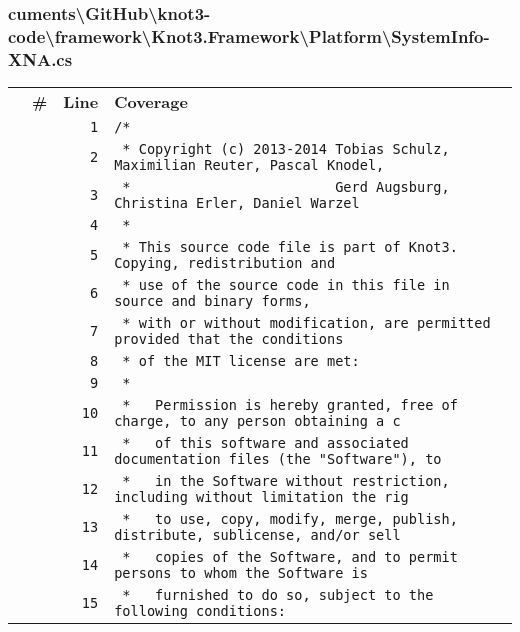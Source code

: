 \documentclass[a4paper,10pt]{article}
\begin{document}
\subsubsection{cuments\textbackslash GitHub\textbackslash knot3-code\textbackslash framework\textbackslash Knot3.Framework\textbackslash Platform\textbackslash SystemInfo-XNA.cs}
\begin{longtable}[l]{lrrl}
\textbf{} & \textbf{\#} & \textbf{Line} & \textbf{Coverage}\\
\cellcolor{gray} &  & \verb~1~ & \verb~/*~\\
\cellcolor{gray} &  & \verb~2~ & \verb~ * Copyright (c) 2013-2014 Tobias Schulz, Maximilian Reuter, Pascal Knodel,~\\
\cellcolor{gray} &  & \verb~3~ & \verb~ *                         Gerd Augsburg, Christina Erler, Daniel Warzel~\\
\cellcolor{gray} &  & \verb~4~ & \verb~ *~\\
\cellcolor{gray} &  & \verb~5~ & \verb~ * This source code file is part of Knot3. Copying, redistribution and~\\
\cellcolor{gray} &  & \verb~6~ & \verb~ * use of the source code in this file in source and binary forms,~\\
\cellcolor{gray} &  & \verb~7~ & \verb~ * with or without modification, are permitted provided that the conditions~\\
\cellcolor{gray} &  & \verb~8~ & \verb~ * of the MIT license are met:~\\
\cellcolor{gray} &  & \verb~9~ & \verb~ *~\\
\cellcolor{gray} &  & \verb~10~ & \verb~ *   Permission is hereby granted, free of charge, to any person obtaining a c~\\
\cellcolor{gray} &  & \verb~11~ & \verb~ *   of this software and associated documentation files (the "Software"), to ~\\
\cellcolor{gray} &  & \verb~12~ & \verb~ *   in the Software without restriction, including without limitation the rig~\\
\cellcolor{gray} &  & \verb~13~ & \verb~ *   to use, copy, modify, merge, publish, distribute, sublicense, and/or sell~\\
\cellcolor{gray} &  & \verb~14~ & \verb~ *   copies of the Software, and to permit persons to whom the Software is~\\
\cellcolor{gray} &  & \verb~15~ & \verb~ *   furnished to do so, subject to the following conditions:~\\

\end{longtable}
\end{document}
